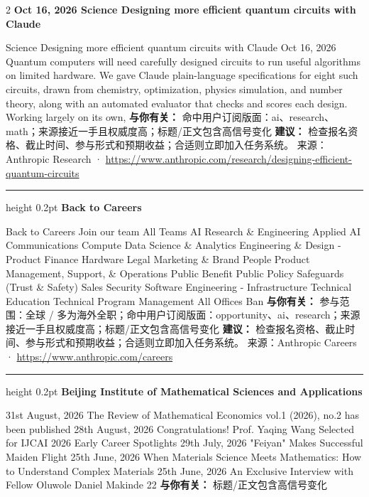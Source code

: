 \documentclass[10.5pt]{ctexart}
\begin{document}
\begin{multicols}{2}
{\large\bfseries Oct 16, 2026 Science Designing more efficient quantum circuits with Claude}\par
Science Designing more efficient quantum circuits with Claude Oct 16, 2026 Quantum computers will need carefully designed circuits to run useful algorithms on limited hardware. We gave Claude plain-language specifications for eight such circuits, drawn from chemistry, optimization, physics simulation, and number theory, along with an automated evaluator that checks and scores each design. Working largely on its own, 
\textbf{与你有关：} 命中用户订阅版面：ai、research、math；来源接近一手且权威度高；标题/正文包含高信号变化
\textbf{建议：} 检查报名资格、截止时间、参与形式和预期收益；合适则立即加入任务系统。
{\footnotesize\color{ormuted} 来源：Anthropic Research · \url{https://www.anthropic.com/research/designing-efficient-quantum-circuits}}
\vspace{2mm}
\hrule height 0.2pt
\vspace{2mm}
{\large\bfseries Back to Careers}\par
Back to Careers Join our team All Teams AI Research \& Engineering Applied AI Communications Compute Data Science \& Analytics Engineering \& Design - Product Finance Hardware Legal Marketing \& Brand People Product Management, Support, \& Operations Public Benefit Public Policy Safeguards (Trust \& Safety) Sales Security Software Engineering - Infrastructure Technical Education Technical Program Management All Offices Ban
\textbf{与你有关：} 参与范围：全球 / 多为海外全职；命中用户订阅版面：opportunity、ai、research；来源接近一手且权威度高；标题/正文包含高信号变化
\textbf{建议：} 检查报名资格、截止时间、参与形式和预期收益；合适则立即加入任务系统。
{\footnotesize\color{ormuted} 来源：Anthropic Careers · \url{https://www.anthropic.com/careers}}
\vspace{2mm}
\hrule height 0.2pt
\vspace{2mm}
{\large\bfseries Beijing Institute of Mathematical Sciences and Applications}\par
31st August, 2026 The Review of Mathematical Economics vol.1 (2026), no.2 has been published 28th August, 2026 Congratulations! Prof. Yaqing Wang Selected for IJCAI 2026 Early Career Spotlights 29th July, 2026 "Feiyan" Makes Successful Maiden Flight 25th June, 2026 When Materials Science Meets Mathematics: How to Understand Complex Materials 25th June, 2026 An Exclusive Interview with Fellow Oluwole Daniel Makinde 22
\textbf{与你有关：} 标题/正文包含高信号变化

\end{multicols}
\end{document}
